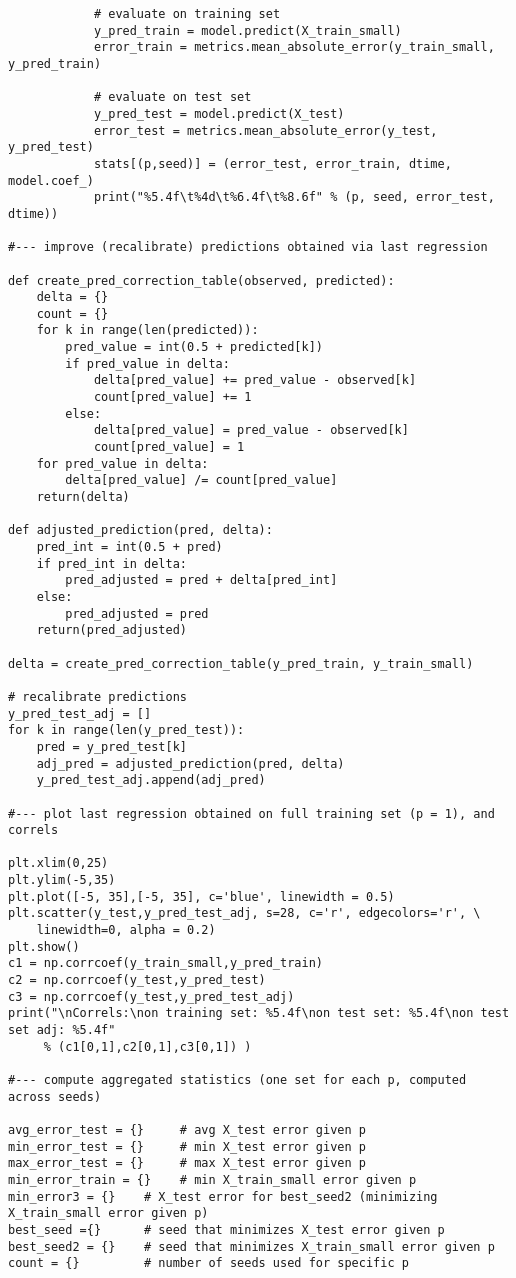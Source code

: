 \documentclass[oneside,10pt]{book}
\begin{document}
\begin{lstlisting}
            # evaluate on training set
            y_pred_train = model.predict(X_train_small)
            error_train = metrics.mean_absolute_error(y_train_small, y_pred_train)

            # evaluate on test set
            y_pred_test = model.predict(X_test)
            error_test = metrics.mean_absolute_error(y_test, y_pred_test)
            stats[(p,seed)] = (error_test, error_train, dtime, model.coef_)
            print("%5.4f\t%4d\t%6.4f\t%8.6f" % (p, seed, error_test, dtime))

#--- improve (recalibrate) predictions obtained via last regression

def create_pred_correction_table(observed, predicted):
    delta = {}
    count = {}
    for k in range(len(predicted)):
        pred_value = int(0.5 + predicted[k])
        if pred_value in delta:
            delta[pred_value] += pred_value - observed[k]
            count[pred_value] += 1
        else:
            delta[pred_value] = pred_value - observed[k]
            count[pred_value] = 1
    for pred_value in delta:
        delta[pred_value] /= count[pred_value]
    return(delta)

def adjusted_prediction(pred, delta):
    pred_int = int(0.5 + pred)
    if pred_int in delta:
        pred_adjusted = pred + delta[pred_int]
    else:
        pred_adjusted = pred
    return(pred_adjusted)

delta = create_pred_correction_table(y_pred_train, y_train_small)

# recalibrate predictions
y_pred_test_adj = []
for k in range(len(y_pred_test)):
    pred = y_pred_test[k]
    adj_pred = adjusted_prediction(pred, delta)
    y_pred_test_adj.append(adj_pred)

#--- plot last regression obtained on full training set (p = 1), and correls

plt.xlim(0,25)
plt.ylim(-5,35)
plt.plot([-5, 35],[-5, 35], c='blue', linewidth = 0.5)
plt.scatter(y_test,y_pred_test_adj, s=28, c='r', edgecolors='r', \
    linewidth=0, alpha = 0.2)
plt.show()
c1 = np.corrcoef(y_train_small,y_pred_train)
c2 = np.corrcoef(y_test,y_pred_test)
c3 = np.corrcoef(y_test,y_pred_test_adj)
print("\nCorrels:\non training set: %5.4f\non test set: %5.4f\non test set adj: %5.4f"
     % (c1[0,1],c2[0,1],c3[0,1]) )

#--- compute aggregated statistics (one set for each p, computed across seeds)

avg_error_test = {}     # avg X_test error given p
min_error_test = {}     # min X_test error given p
max_error_test = {}     # max X_test error given p
min_error_train = {}    # min X_train_small error given p
min_error3 = {}    # X_test error for best_seed2 (minimizing X_train_small error given p)
best_seed ={}      # seed that minimizes X_test error given p
best_seed2 = {}    # seed that minimizes X_train_small error given p
count = {}         # number of seeds used for specific p


\end{lstlisting}
\end{document}
